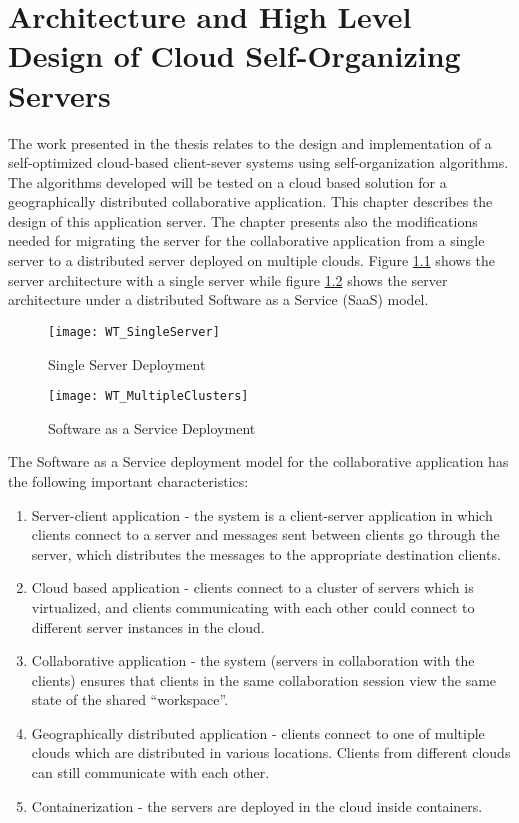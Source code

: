 \chapter{Architecture and High Level Design of Cloud Self-Organizing Servers} %
\label{Chapter3}

The work presented in the thesis relates to the design and implementation of a self-optimized cloud-based client-sever systems using self-organization algorithms. The algorithms developed will be tested on a cloud based solution for a geographically distributed collaborative application. This chapter describes the design of this application server. The chapter presents also the modifications needed for migrating the server for the collaborative application from a single server to a distributed server deployed on multiple clouds. Figure \ref{fig:wtsingleserver} shows the server architecture with a single server while figure \ref{fig:wtmultipleservers} shows the server architecture under a distributed Software as a Service (SaaS) model.

\begin{figure}
	\centering
	\texttt{[image: WT\_SingleServer]}
	\caption{Single Server Deployment}
	\label{fig:wtsingleserver}
\end{figure}

\begin{figure}
	\centering
	\texttt{[image: WT\_MultipleClusters]}
	\caption{Software as a Service Deployment}
	\label{fig:wtmultipleservers}
\end{figure}

The Software as a Service deployment model for the collaborative application has the following important characteristics:

\begin{enumerate}
	\item Server-client application - the system is a client-server application in which clients connect to a server and messages sent between clients go through the server, which distributes the messages to the appropriate destination clients.
	\item Cloud based application - clients connect to a cluster of servers which is virtualized, and clients communicating with each other could connect to different server instances in the cloud.
	\item Collaborative application - the system (servers in collaboration with the clients) ensures that clients in the same collaboration session view the same state of the shared ``workspace''. 
	\item Geographically distributed application - clients connect to one of multiple clouds which are distributed in various locations. Clients from different clouds can still communicate with each other.
	\item Containerization - the servers are deployed in the cloud inside containers.
\end{enumerate}

